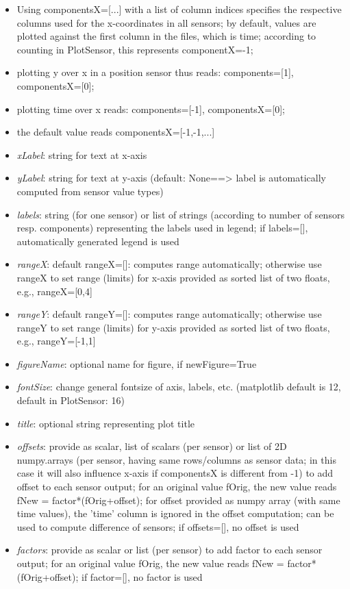 \begin{itemize}[leftmargin=0.7cm]
\begin{itemize}[leftmargin=1.2cm]
\item[]Using componentsX=[...] with a list of column indices specifies the respective columns used for the x-coordinates in all sensors; by default, values are plotted against the first column in the files, which is time; according to counting in PlotSensor, this represents componentX=-1;
\item[]plotting y over x in a position sensor thus reads: components=[1], componentsX=[0];
\item[]plotting time over x reads: components=[-1], componentsX=[0];
\item[]the default value reads componentsX=[-1,-1,...]
\item[]{\it xLabel}: string for text at x-axis
\item[]{\it yLabel}: string for text at y-axis (default: None==> label is automatically computed from sensor value types)
\item[]{\it labels}: string (for one sensor) or list of strings (according to number of sensors resp. components) representing the labels used in legend; if labels=[], automatically generated legend is used
\item[]{\it rangeX}: default rangeX=[]: computes range automatically; otherwise use rangeX to set range (limits) for x-axis provided as sorted list of two floats, e.g., rangeX=[0,4]
\item[]{\it rangeY}: default rangeY=[]: computes range automatically; otherwise use rangeY to set range (limits) for y-axis provided as sorted list of two floats, e.g., rangeY=[-1,1]
\item[]{\it figureName}: optional name for figure, if newFigure=True
\item[]{\it fontSize}: change general fontsize of axis, labels, etc. (matplotlib default is 12, default in PlotSensor: 16)
\item[]{\it title}: optional string representing plot title
\item[]{\it offsets}: provide as scalar, list of scalars (per sensor) or list of 2D numpy.arrays (per sensor, having same rows/columns as sensor data; in this case it will also influence x-axis if componentsX is different from -1) to add offset to each sensor output; for an original value fOrig, the new value reads fNew = factor*(fOrig+offset); for offset provided as numpy array (with same time values), the 'time' column is ignored in the offset computation; can be used to compute difference of sensors; if offsets=[], no offset is used
\item[]{\it factors}: provide as scalar or list (per sensor) to add factor to each sensor output; for an original value fOrig, the new value reads fNew = factor*(fOrig+offset); if factor=[], no factor is used

\end{itemize}
\end{itemize}
